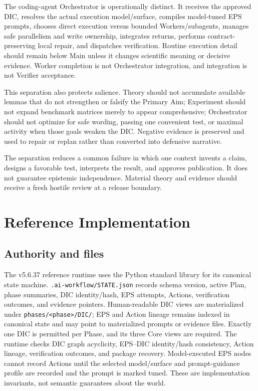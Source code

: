 \documentclass[11pt]{article}
\begin{document}
The coding-agent Orchestrator is operationally distinct. It receives the approved DIC, resolves the actual execution model/surface, compiles model-tuned EPS prompts, chooses direct execution versus bounded Workers/subagents, manages safe parallelism and write ownership, integrates returns, performs contract-preserving local repair, and dispatches verification. Routine execution detail should remain below Main unless it changes scientific meaning or decisive evidence. Worker completion is not Orchestrator integration, and integration is not Verifier acceptance.

This separation also protects salience. Theory should not accumulate available lemmas that do not strengthen or falsify the Primary Aim; Experiment should not expand benchmark matrices merely to appear comprehensive; Orchestrator should not optimize for safe wording, passing one convenient test, or maximal activity when those goals weaken the DIC. Negative evidence is preserved and used to repair or replan rather than converted into defensive narrative.

The separation reduces a common failure in which one context invents a claim, designs a favorable test, interprets the result, and approves publication. It does not guarantee epistemic independence. Material theory and evidence should receive a fresh hostile review at a release boundary.

\section{Reference Implementation}
\subsection{Authority and files}
The v5.6.37 reference runtime uses the Python standard library for its canonical state machine. \texttt{.ai-workflow/STATE.json} records schema version, active Plan, phase summaries, DIC identity/hash, EPS attempts, Actions, verification outcomes, and evidence pointers. Human-readable DIC views are materialized under \texttt{phases/<phase>/DIC/}; EPS and Action lineage remains indexed in canonical state and may point to materialized prompts or evidence files. Exactly one DIC is permitted per Phase, and its three Core views are required. The runtime checks DIC graph acyclicity, EPS--DIC identity/hash consistency, Action lineage, verification outcomes, and package recovery. Model-executed EPS nodes cannot record Actions until the selected model/surface and prompt-guidance profile are recorded and the prompt is marked tuned. These are implementation invariants, not semantic guarantees about the world.
\end{document}
